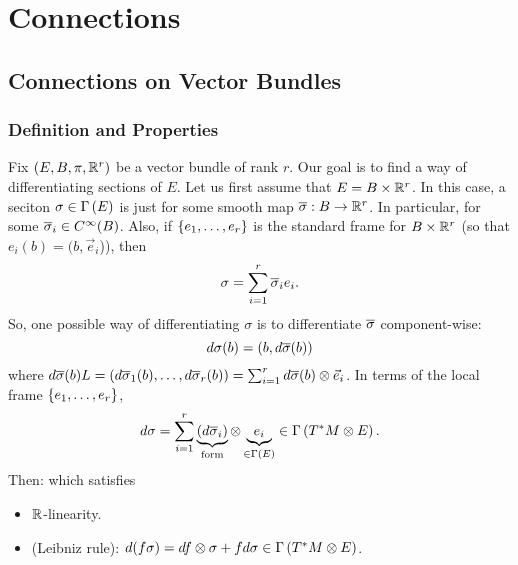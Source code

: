 \documentclass[main.tex]{subfiles}
\begin{document}
\section{Connections}

\subsection{Connections on Vector Bundles}

\subsubsection{Definition and Properties}

Fix $(E, B, \pi, \mathbb{R}^r)$ be a vector bundle of rank $r$. Our goal is to find a way of differentiating sections of $E$. Let us first assume that $E = B \times \mathbb{R}^r$. In this case, a seciton $\sigma \in \Gamma\left( E \right)$ is just 
for some smooth map $\overline{\sigma}: B \to \mathbb{R}^r$. In particular, 
 for some $\overline{\sigma}_i \in C^\infty(B)$. Also, if $\left\{e_1, \dots, e_r\right\}$ is the standard frame for $B \times \mathbb{R}^r$ (so that $e_i(b) = (b, \vec{e}_i$)), then
\[
\sigma = \sum_{i=1}^r \overline{\sigma}_i e_i.
\]
So, one possible way of differentiating $\sigma$ is to differentiate $\overline{\sigma}$ component-wise: 
\[
d \sigma(b) = (b, d \overline{\sigma}(b))
\]
where $d \overline{\sigma}(b) L= \left(  d\overline{\sigma}_1(b), \dots, d \overline{\sigma}_r(b) \right) = \sum_{i=1}^r d \overline{\sigma}(b) \otimes \vec{e}_i$.
In terms of the local frame $\left\{e_1, \dots, e_r\right\}$,
\[
d\sigma = \sum_{i=1}^r \underbrace{(d \overline{\sigma}_i)}_{\text{form}} \otimes \underbrace{e_i}_{\in \Gamma\left( E \right)} \in \Gamma\left( T^*M \otimes E \right).
\]
Then:
which satisfies
\begin{itemize}
    \item $\mathbb{R}$-linearity.
    \item (Leibniz rule): $d(f\sigma) = df \otimes \sigma + f d\sigma \in \Gamma\left( T^*M \otimes E \right)$.
\end{itemize}
\end{document}
